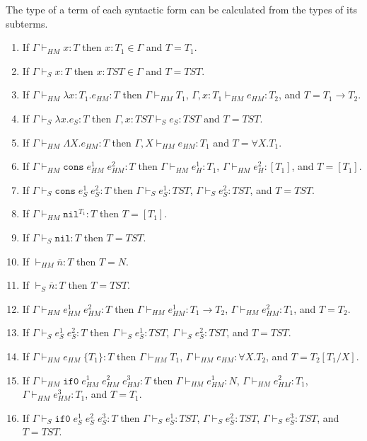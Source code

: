 \begin{lemma}
\label{i}
\onehalfspacing
The type of a term of each syntactic form can be calculated from the types of its subterms.
\begin{enumerate}
\item If $\Gamma\vdash_{HM}x:T$ then $x:T_{1}\in\Gamma$ and $T=T_{1}$.
\item If $\Gamma\vdash_{S}x:T$ then $x:TST\in\Gamma$ and $T=TST$.
\item If $\Gamma\vdash_{HM}\lambda x:T_{1}.e_{HM}:T$ then $\Gamma\vdash_{HM}T_{1}$, $\Gamma,x:T_{1}\vdash_{HM}e_{HM}:T_{2}$, and $T=T_{1}\rightarrow T_{2}$.
\item If $\Gamma\vdash_{S}\lambda x.e_{S}:T$ then $\Gamma,x:TST\vdash_{S}e_{S}:TST$ and $T=TST$.
\item If $\Gamma\vdash_{HM}\Lambda X.e_{HM}:T$ then $\Gamma,X\vdash_{HM}e_{HM}:T_{1}$ and $T=\forall X.T_{1}$.
\item If $\Gamma\vdash_{HM}\mathtt{cons}\;e_{HM}^{1}\;e_{HM}^{2}:T$ then $\Gamma\vdash_{HM}e_{H}^{1}:T_{1}$, $\Gamma\vdash_{HM}e_{H}^{2}:[T_{1}]$, and $T=[T_{1}]$.
\item If $\Gamma\vdash_{S}\mathtt{cons}\;e_{S}^{1}\;e_{S}^{2}:T$ then $\Gamma\vdash_{S}e_{S}^{1}:TST$, $\Gamma\vdash_{S}e_{S}^{2}:TST$, and $T=TST$.
\item If $\Gamma\vdash_{HM}\mathtt{nil}^{T_{1}}:T$ then $T=[T_{1}]$.
\item If $\Gamma\vdash_{S}\mathtt{nil}:T$ then $T=TST$.
\item If $\vdash_{HM}\overline{n}:T$ then $T=N$.
\item If $\vdash_{S}\overline{n}:T$ then $T=TST$.
\item If $\Gamma\vdash_{HM}e_{HM}^{1}\;e_{HM}^{2}:T$ then $\Gamma\vdash_{HM}e_{HM}^{1}:T_{1}\rightarrow T_{2}$, $\Gamma\vdash_{HM}e_{HM}^{2}:T_{1}$, and $T=T_{2}$.
\item If $\Gamma\vdash_{S}e_{S}^{1}\;e_{S}^{2}:T$ then $\Gamma\vdash_{S}e_{S}^{1}:TST$, $\Gamma\vdash_{S}e_{S}^{2}:TST$, and $T=TST$.
\item If $\Gamma\vdash_{HM}e_{HM}\;\lbrace T_{1}\rbrace:T$ then $\Gamma\vdash_{HM}T_{1}$, $\Gamma\vdash_{HM}e_{HM}:\forall X.T_{2}$, and $T=T_{2}[T_{1}/X]$.
\item If $\Gamma\vdash_{HM}\mathtt{if0}\;e_{HM}^{1}\;e_{HM}^{2}\;e_{HM}^{3}:T$ then $\Gamma\vdash_{HM}e_{HM}^{1}:N$, $\Gamma\vdash_{HM}e_{HM}^{2}:T_{1}$, $\Gamma\vdash_{HM}e_{HM}^{3}:T_{1}$, and $T=T_{1}$.
\item If $\Gamma\vdash_{S}\mathtt{if0}\;e_{S}^{1}\;e_{S}^{2}\;e_{S}^{3}:T$ then $\Gamma\vdash_{S}e_{S}^{1}:TST$, $\Gamma\vdash_{S}e_{S}^{2}:TST$, $\Gamma\vdash_{S}e_{S}^{3}:TST$, and $T=TST$.

\end{enumerate}
\end{lemma}
